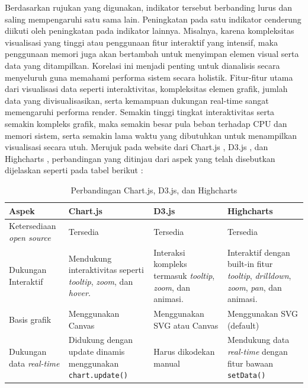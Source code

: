 Berdasarkan rujukan yang digunakan, indikator tersebut berbanding lurus dan saling mempengaruhi satu sama lain. Peningkatan pada satu indikator cenderung diikuti oleh peningkatan pada indikator lainnya. Misalnya, karena kompleksitas visualisasi yang tinggi atau penggunaan fitur interaktif yang intensif, maka penggunaan memori juga akan bertambah untuk menyimpan elemen visual serta data yang ditampilkan. Korelasi ini menjadi penting untuk dianalisis secara menyeluruh guna memahami performa sistem secara holistik. Fitur-fitur utama dari visualisasi data seperti interaktivitas, kompleksitas elemen grafik, jumlah data yang divisualisasikan, serta kemampuan dukungan real-time sangat memengaruhi performa render. Semakin tinggi tingkat interaktivitas serta semakin kompleks grafik, maka semakin besar pula beban terhadap CPU dan memori sistem, serta semakin lama waktu yang dibutuhkan untuk menampilkan visualisasi secara utuh. Merujuk pada website dari Chart.js \cite{ChartJs}, D3.js \cite{D3}, dan Highcharts \cite{Highcharts}, perbandingan yang ditinjau dari aspek yang telah disebutkan dijelaskan seperti pada tabel berikut :
\begin{table}[H]
	\centering
	\renewcommand{\arraystretch}{1.5} %
	\caption{Perbandingan Chart.js, D3.js, dan Highcharts}
	\label{tab:perbandingan_library}
	\begin{tabular}{|>{\raggedright\arraybackslash}p{3.5cm}
			|>{\raggedright\arraybackslash}p{3.5cm}
			|>{\raggedright\arraybackslash}p{3.5cm}
			|>{\raggedright\arraybackslash}p{3.5cm}|}
		\hline
		\rowcolor[gray]{0.85}
		\textbf{Aspek} & \textbf{Chart.js} & \textbf{D3.js} & \textbf{Highcharts} \\
		\hline
		Ketersediaan \textit{open source} 
		& Tersedia 
		& Tersedia 
		& Tersedia \\ 
		\hline
		Dukungan Interaktif 
		& Mendukung interaktivitas seperti \textit{tooltip}, \textit{zoom}, dan \textit{hover}. 
		& Interaksi kompleks termasuk \textit{tooltip}, \textit{zoom}, dan animasi.
		& Interaktif dengan built-in fitur \textit{tooltip}, \textit{drilldown}, \textit{zoom}, \textit{pan}, dan animasi. \\
		\hline
		Basis grafik 
		& Menggunakan Canvas 
		& Menggunakan SVG atau Canvas 
		& Menggunakan SVG (default) \\
		\hline
		Dukungan data \textit{real-time} 
		& Didukung dengan update dinamis menggunakan \texttt{chart.update()} 
		& Harus dikodekan manual 
		& Mendukung data \textit{real-time} dengan fitur bawaan \texttt{setData()} \\
		\hline
	\end{tabular}
\end{table}

